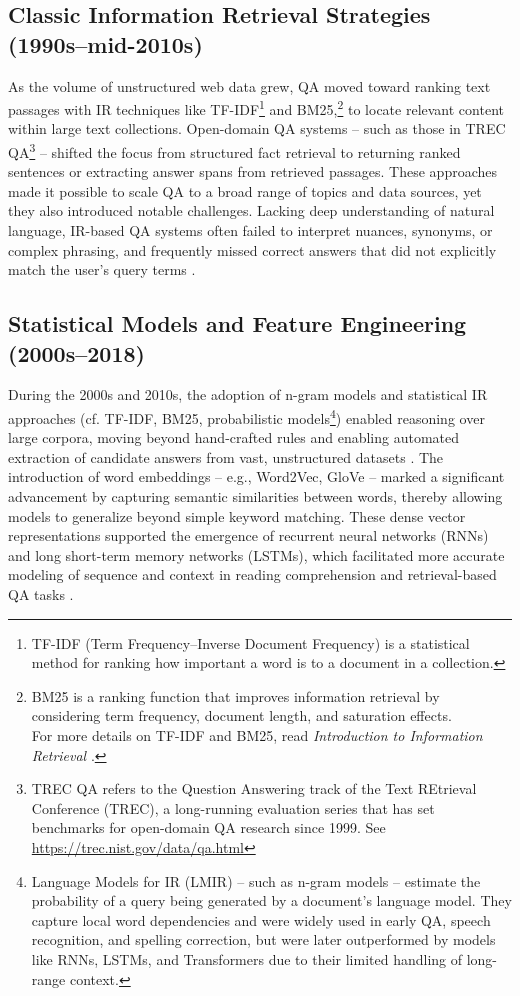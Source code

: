 \begin{spacing}{1.5}
\subsection{Classic Information Retrieval Strategies (1990s--mid-2010s)}
As the volume of unstructured web data grew, QA moved toward ranking text passages with IR techniques like TF-IDF\footnote{TF-IDF (Term Frequency–Inverse Document Frequency) is a statistical method for ranking how important a word is to a document in a collection.} and BM25,\footnote{BM25 is a ranking function that improves information retrieval by considering term frequency, document length, and saturation effects.\\For more details on TF-IDF and BM25, read \textit{Introduction to Information Retrieval} \citep{manning_introduction_2008}.} to locate relevant content within large text collections. Open-domain QA systems -- such as those in TREC QA\footnote{TREC QA refers to the Question Answering track of the Text REtrieval Conference (TREC), a long-running evaluation series that has set benchmarks for open-domain QA research since 1999. See \url{https://trec.nist.gov/data/qa.html}} \citep{hirschman_natural_2001} -- shifted the focus from structured fact retrieval to returning ranked sentences or extracting answer spans from retrieved passages. These approaches made it possible to scale QA to a broad range of topics and data sources, yet they also introduced notable challenges. Lacking deep understanding of natural language, IR-based QA systems often failed to interpret nuances, synonyms, or complex phrasing, and frequently missed correct answers that did not explicitly match the user’s query terms \citep{antoniou_survey_2022, caballero_brief_2021}.

\subsection{Statistical Models and Feature Engineering (2000s--2018)}
During the 2000s and 2010s, the adoption of n-gram models and statistical IR approaches (cf. TF-IDF, BM25, probabilistic models\footnote{Language Models for IR (LMIR) -- such as n-gram models -- estimate the probability of a query being generated by a document's language model. They capture local word dependencies and were widely used in early QA, speech recognition, and spelling correction, \citep{ponte_language_1998} but were later outperformed by models like RNNs, LSTMs, and Transformers due to their limited handling of long-range context.}) enabled reasoning over large corpora, moving beyond hand-crafted rules and enabling automated extraction of candidate answers from vast, unstructured datasets \citep{manning_introduction_2008}. The introduction of word embeddings -- e.g., Word2Vec, GloVe -- marked a significant advancement by capturing semantic similarities between words, thereby allowing models to generalize beyond simple keyword matching. These dense vector representations supported the emergence of recurrent neural networks (RNNs) and long short-term memory networks (LSTMs), which facilitated more accurate modeling of sequence and context in reading comprehension and retrieval-based QA tasks \citep{jurafsky_chapter_2024}. 


\end{spacing}
